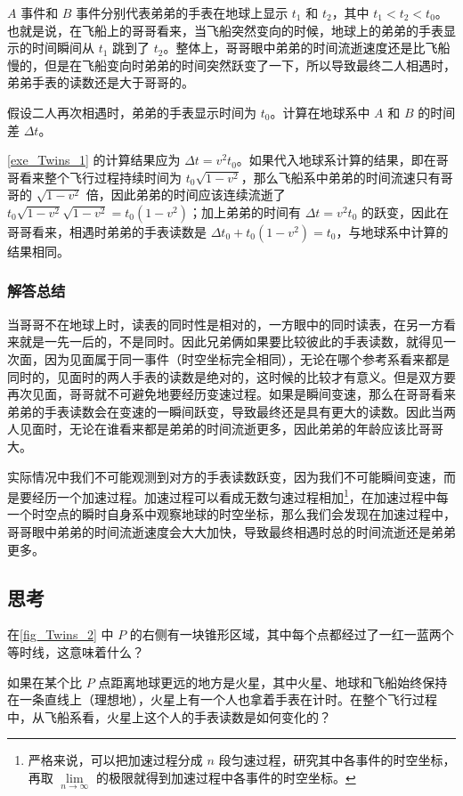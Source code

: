 $A$ 事件和 $B$ 事件分别代表弟弟的手表在地球上显示 $t_1$ 和 $t_2$，其中 $t_1<t_2<t_0$。也就是说，在飞船上的哥哥看来，当飞船突然变向的时候，地球上的弟弟的手表显示的时间瞬间从 $t_1$ 跳到了 $t_2$。整体上，哥哥眼中弟弟的时间流逝速度还是比飞船慢的，但是在飞船变向时弟弟的时间突然跃变了一下，所以导致最终二人相遇时，弟弟手表的读数还是大于哥哥的。

\begin{exercise}{}\label{exe_Twins_1}
假设二人再次相遇时，弟弟的手表显示时间为 $t_0$。计算在地球系中 $A$ 和 $B$ 的时间差 $\Delta t$。
\end{exercise}

\autoref{exe_Twins_1} 的计算结果应为 $\Delta t=v^2t_0$。如果代入地球系计算的结果，即在哥哥看来整个飞行过程持续时间为 $t_0\sqrt{1-v^2}$，那么飞船系中弟弟的时间流速只有哥哥的 $\sqrt{1-v^2}$ 倍，因此弟弟的时间应该连续流逝了 $t_0\sqrt{1-v^2}\sqrt{1-v^2}=t_0(1-v^2)$；加上弟弟的时间有 $\Delta t=v^2t_0$ 的跃变，因此在哥哥看来，相遇时弟弟的手表读数是 $\Delta t_0+t_0(1-v^2)=t_0$，与地球系中计算的结果相同。

\subsubsection{解答总结}

当哥哥不在地球上时，读表的同时性是相对的，一方眼中的同时读表，在另一方看来就是一先一后的，不是同时。因此兄弟俩如果要比较彼此的手表读数，就得见一次面，因为见面属于同一事件（时空坐标完全相同），无论在哪个参考系看来都是同时的，见面时的两人手表的读数是绝对的，这时候的比较才有意义。但是双方要再次见面，哥哥就不可避免地要经历变速过程。如果是瞬间变速，那么在哥哥看来弟弟的手表读数会在变速的一瞬间跃变，导致最终还是具有更大的读数。因此当两人见面时，无论在谁看来都是弟弟的时间流逝更多，因此弟弟的年龄应该比哥哥大。

实际情况中我们不可能观测到对方的手表读数跃变，因为我们不可能瞬间变速，而是要经历一个加速过程。加速过程可以看成无数匀速过程相加\footnote{严格来说，可以把加速过程分成 $n$ 段匀速过程，研究其中各事件的时空坐标，再取 $\lim\limits_{n\rightarrow\infty}$ 的极限就得到加速过程中各事件的时空坐标。}，在加速过程中每一个时空点的瞬时自身系中观察地球的时空坐标，那么我们会发现在加速过程中，哥哥眼中弟弟的时间流逝速度会大大加快，导致最终相遇时总的时间流逝还是弟弟更多。

\subsection{思考}

在\autoref{fig_Twins_2} 中 $P$ 的右侧有一块锥形区域，其中每个点都经过了一红一蓝两个等时线，这意味着什么？

如果在某个比 $P$ 点距离地球更远的地方是火星，其中火星、地球和飞船始终保持在一条直线上（理想地），火星上有一个人也拿着手表在计时。在整个飞行过程中，从飞船系看，火星上这个人的手表读数是如何变化的？







